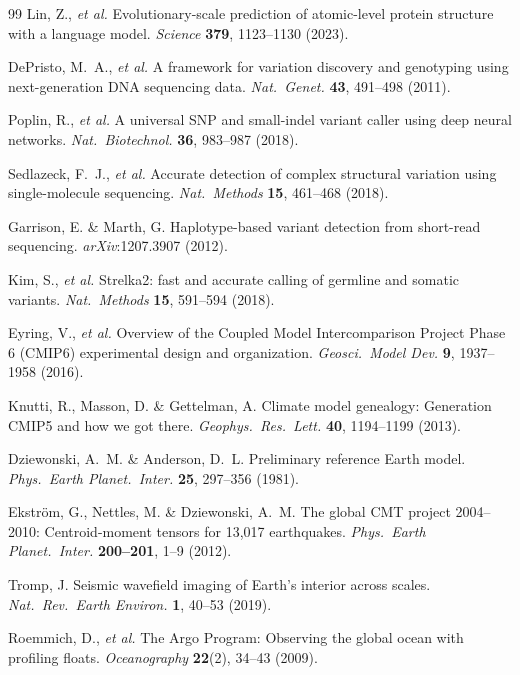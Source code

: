 \documentclass[12pt,a4paper]{article}
\begin{document}
\begin{thebibliography}{99}
Lin, Z., \emph{et al.} Evolutionary-scale prediction of atomic-level protein structure with a language model. \textit{Science} \textbf{379}, 1123--1130 (2023).

DePristo, M.\ A., \emph{et al.} A framework for variation discovery and genotyping using next-generation DNA sequencing data. \textit{Nat.\ Genet.} \textbf{43}, 491--498 (2011).

Poplin, R., \emph{et al.} A universal SNP and small-indel variant caller using deep neural networks. \textit{Nat.\ Biotechnol.} \textbf{36}, 983--987 (2018).

Sedlazeck, F.\ J., \emph{et al.} Accurate detection of complex structural variation using single-molecule sequencing. \textit{Nat.\ Methods} \textbf{15}, 461--468 (2018).

Garrison, E. \& Marth, G. Haplotype-based variant detection from short-read sequencing. \textit{arXiv}:1207.3907 (2012).

Kim, S., \emph{et al.} Strelka2: fast and accurate calling of germline and somatic variants. \textit{Nat.\ Methods} \textbf{15}, 591--594 (2018).

Eyring, V., \emph{et al.} Overview of the Coupled Model Intercomparison Project Phase 6 (CMIP6) experimental design and organization. \textit{Geosci.\ Model Dev.} \textbf{9}, 1937--1958 (2016).

Knutti, R., Masson, D. \& Gettelman, A. Climate model genealogy: Generation CMIP5 and how we got there. \textit{Geophys.\ Res.\ Lett.} \textbf{40}, 1194--1199 (2013).

Dziewonski, A.\ M. \& Anderson, D.\ L. Preliminary reference Earth model. \textit{Phys.\ Earth Planet.\ Inter.} \textbf{25}, 297--356 (1981).

Ekstr\"{o}m, G., Nettles, M. \& Dziewonski, A.\ M. The global CMT project 2004--2010: Centroid-moment tensors for 13,017 earthquakes. \textit{Phys.\ Earth Planet.\ Inter.} \textbf{200--201}, 1--9 (2012).

Tromp, J. Seismic wavefield imaging of Earth's interior across scales. \textit{Nat.\ Rev.\ Earth Environ.} \textbf{1}, 40--53 (2019).

Roemmich, D., \emph{et al.} The Argo Program: Observing the global ocean with profiling floats. \textit{Oceanography} \textbf{22}(2), 34--43 (2009).


\end{thebibliography}
\end{document}
